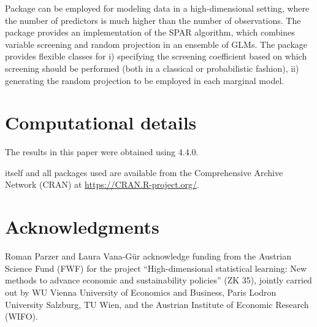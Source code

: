 \documentclass[
  article]{jss}
\begin{document}
Package  can be employed for modeling data in a
high-dimensional setting, where the number of predictors is much higher
than the number of observations. The package provides an implementation
of the SPAR algorithm, which combines variable screening and random
projection in an ensemble of GLMs. The package provides flexible classes
for i) specifying the screening coefficient based on which screening
should be performed (both in a classical or probabilistic fashion), ii)
generating the random projection to be employed in each marginal model.

\section*{Computational details}\label{computational-details}

The results in this paper were obtained using  4.4.0.

 itself and all packages used are available from the
Comprehensive  Archive Network (CRAN) at
\url{https://CRAN.R-project.org/}.

\section*{Acknowledgments}\label{acknowledgments}

Roman Parzer and Laura Vana-Gür acknowledge funding from the Austrian
Science Fund (FWF) for the project ``High-dimensional statistical
learning: New methods to advance economic and sustainability policies''
(ZK 35), jointly carried out by WU Vienna University of Economics and
Business, Paris Lodron University Salzburg, TU Wien, and the Austrian
Institute of Economic Research (WIFO).


\renewcommand\refname{References}
  
\end{document}
